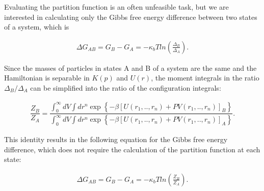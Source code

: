 \documentclass[
	12pt,				%
	openany,			%
	oneside,			%
	a4paper,			%
	english,			%
	brazil				%
	]{abntex2}
\providecommand{\DIFaddbegin}{}
\providecommand{\DIFaddend}{}
\providecommand{\DIFdelbegin}{}
\providecommand{\DIFdelend}{}
\providecommand{\DIFaddbegin}{} %
\providecommand{\DIFaddend}{} %
\providecommand{\DIFdelbegin}{} %
\providecommand{\DIFdelend}{} %
\begin{document}
Evaluating the partition function is an often unfeasible task, but we are interested in calculating only the Gibbs free energy difference between two states of a system, which is  

\begin{equation}
\begin{aligned}
\Delta G_{AB} = G_{B} - G_{A}= -\kappa_{b}T ln \left( \frac{\Delta_{B}}{\Delta_{A}}\right) .
\end{aligned}
\end{equation}

Since the masses of particles in states A and B of a system are the same and the Hamiltonian is separable in $K(p)$ and $U(r)$, the moment integrals in the ratio ${\Delta_{B}}/{\Delta_{A}}$ can be simplified into the ratio of the configuration integrals:

\begin{equation}
\label{eq:partiso}
\DIFdelbegin %
\DIFdelend \DIFaddbegin \begin{aligned}
\dfrac{Z_{B}}{Z_{A}} = \dfrac{\int_{0}^{\infty} dV \int dr^{n} \exp \left\lbrace -\beta \left[U(r_{1},..,r_{n}) + PV(r_{1},..,r_{n}) \right]_{B} \right\rbrace}{\int_{0}^{\infty} dV \int dr^{n} \exp \left\lbrace  -\beta \left[U(r_{1},..,r_{n}) + PV(r_{1},..,r_{n}) \right]_{A} \right\rbrace }.
\end{aligned}
\DIFaddend \end{equation}

This identity results in the following equation for the Gibbs free energy difference, which does not  require the calculation of the partition function at each state:

\begin{equation}
\label{eq:dif}
\begin{aligned}
\Delta G_{AB} = G_{B} - G_{A}= -\kappa_{b}T ln \left( \frac{Z_{B}}{Z_{A}}\right).
\end{aligned}
\end{equation}
\end{document}
